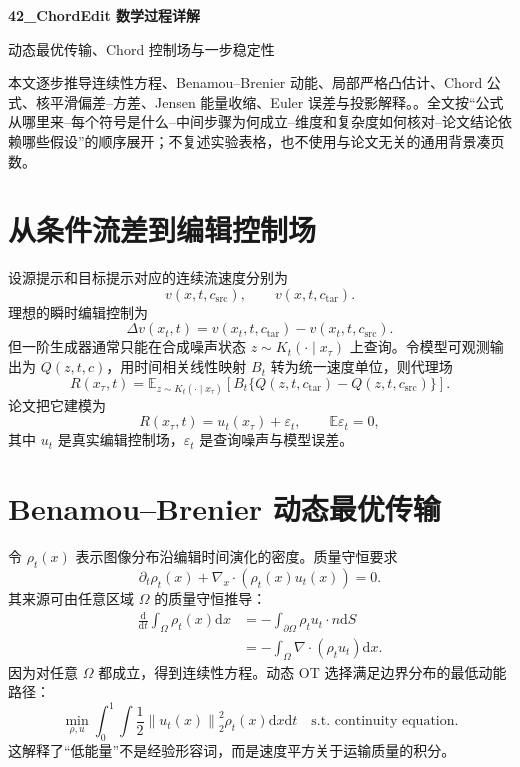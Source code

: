 \documentclass[UTF8,12pt,a4paper,fontset=none]{ctexart}
\numberwithin{equation}{section}
\newcommand{\E}{\mathbb{E}}
\newcommand{\norm}[1]{\left\lVert #1\right\rVert}
\newcommand{\dd}{\mathrm{d}}
\begin{document}
\begin{center}
{\LARGE\bfseries 42\_ChordEdit 数学过程详解}\par
\vspace{0.35em}
{\large 动态最优传输、Chord 控制场与一步稳定性}
\end{center}
\vspace{0.45em}
\begin{keybox}[本文只处理真正需要推导的部分]
本文逐步推导连续性方程、Benamou--Brenier 动能、局部严格凸估计、Chord 公式、核平滑偏差--方差、Jensen 能量收缩、Euler 误差与投影解释。。全文按“公式从哪里来--每个符号是什么--中间步骤为何成立--维度和复杂度如何核对--论文结论依赖哪些假设”的顺序展开；不复述实验表格，也不使用与论文无关的通用背景凑页数。
\end{keybox}
\tableofcontents
\newpage

\section{从条件流差到编辑控制场}
设源提示和目标提示对应的连续流速度分别为
\begin{equation}
 v(x,t,c_{\mathrm{src}}),\qquad v(x,t,c_{\mathrm{tar}}).
\end{equation}
理想的瞬时编辑控制为
\begin{equation}
 \Delta v(x_t,t)
 =v(x_t,t,c_{\mathrm{tar}})-v(x_t,t,c_{\mathrm{src}}).
\end{equation}
但一阶生成器通常只能在合成噪声状态 $z\sim K_t(\cdot\mid x_\tau)$ 上查询。令模型可观测输出为 $Q(z,t,c)$，用时间相关线性映射 $B_t$ 转为统一速度单位，则代理场
\begin{equation}
 \boxed{
 R(x_\tau,t)
 =\E_{z\sim K_t(\cdot\mid x_\tau)}
 \left[B_t\{Q(z,t,c_{\mathrm{tar}})-Q(z,t,c_{\mathrm{src}})\}\right].
 }
\end{equation}
论文把它建模为
\begin{equation}
 R(x_\tau,t)=u_t(x_\tau)+\varepsilon_t,
 \qquad \E\varepsilon_t=0,
\end{equation}
其中 $u_t$ 是真实编辑控制场，$\varepsilon_t$ 是查询噪声与模型误差。

\section{Benamou--Brenier 动态最优传输}
令 $\rho_t(x)$ 表示图像分布沿编辑时间演化的密度。质量守恒要求
\begin{equation}
 \boxed{
 \partial_t\rho_t(x)+\nabla_x\cdot(\rho_t(x)u_t(x))=0.
 }
\end{equation}
其来源可由任意区域 $\Omega$ 的质量守恒推导：
\begin{align}
 \frac{\dd}{\dd t}\int_\Omega\rho_t(x)\dd x
 &=-\int_{\partial\Omega}\rho_tu_t\cdot n\dd S\\
 &=-\int_\Omega\nabla\cdot(\rho_tu_t)\dd x.
\end{align}
因为对任意 $\Omega$ 都成立，得到连续性方程。动态 OT 选择满足边界分布的最低动能路径：
\begin{equation}
 \boxed{
 \min_{\rho,u}\int_0^1\int\frac12\norm{u_t(x)}_2^2\rho_t(x)\dd x\dd t
 \quad\text{s.t. continuity equation}.
 }
\end{equation}
这解释了“低能量”不是经验形容词，而是速度平方关于运输质量的积分。
\end{document}
